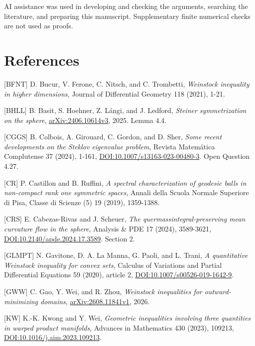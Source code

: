 \documentclass[11pt]{article}
\begin{document}
AI assistance was used in developing and checking the arguments,
searching the literature, and preparing this manuscript. Supplementary
finite numerical checks are not used as proofs.

\raggedright{}\section{References}\label{references}

{[}BFNT{]} D. Bucur, V. Ferone, C. Nitsch, and C. Trombetti,
\emph{Weinstock inequality in higher dimensions}, Journal of
Differential Geometry 118 (2021), 1-21.

{[}BHLL{]} B. Basit, S. Hoehner, Z. Lángi, and J. Ledford, \emph{Steiner
symmetrization on the sphere},
\href{https://arxiv.org/abs/2406.10614}{arXiv:2406.10614v3}, 2025. Lemma
4.4.

{[}CGGS{]} B. Colbois, A. Girouard, C. Gordon, and D. Sher, \emph{Some
recent developments on the Steklov eigenvalue problem}, Revista
Matemática Complutense 37 (2024), 1-161,
\href{https://doi.org/10.1007/s13163-023-00480-3}{DOI:10.1007/s13163-023-00480-3}.
Open Question 4.27.

{[}CR{]} P. Castillon and B. Ruffini, \emph{A spectral characterization
of geodesic balls in non-compact rank one symmetric spaces}, Annali
della Scuola Normale Superiore di Pisa, Classe di Scienze (5) 19 (2019),
1359-1388.

{[}CRS{]} E. Cabezas-Rivas and J. Scheuer, \emph{The
quermassintegral-preserving mean curvature flow in the sphere}, Analysis
\& PDE 17 (2024), 3589-3621,
\href{https://doi.org/10.2140/apde.2024.17.3589}{DOI:10.2140/apde.2024.17.3589}.
Section 2.

{[}GLMPT{]} N. Gavitone, D. A. La Manna, G. Paoli, and L. Trani, \emph{A
quantitative Weinstock inequality for convex sets}, Calculus of
Variations and Partial Differential Equations 59 (2020), article 2,
\href{https://doi.org/10.1007/s00526-019-1642-9}{DOI:10.1007/s00526-019-1642-9}.

{[}GWW{]} C. Gao, Y. Wei, and R. Zhou, \emph{Weinstock inequalities for
outward-minimizing domains},
\href{https://arxiv.org/abs/2608.11841}{arXiv:2608.11841v1}, 2026.

{[}KW{]} K.-K. Kwong and Y. Wei, \emph{Geometric inequalities involving
three quantities in warped product manifolds}, Advances in Mathematics
430 (2023), 109213,
\href{https://doi.org/10.1016/j.aim.2023.109213}{DOI:10.1016/j.aim.2023.109213}.
\end{document}
